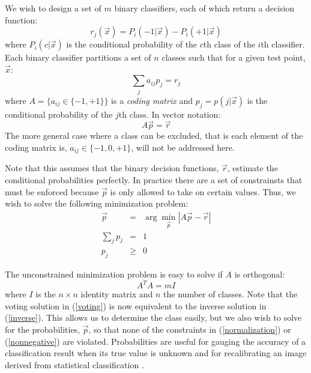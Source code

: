 We wish to design a set of $m$ binary classifiers, each of which return a 
decision function:
\begin{equation}
r_j(\vec x) = P_i(-1 | \vec x) - P_i(+1 | \vec x)
\end{equation}
where $P_i(c | \vec x)$ is the conditional probability of the $c$th class of
the $i$th classifier.
Each binary classifier partitions a set of $n$ classes such that for a
given test point, $\vec x$:
\begin{equation}
\sum_j a_{ij} p_j = r_j
\end{equation}
where $A=\lbrace a_{ij} \in \lbrace -1, +1 \rbrace  \rbrace$ is a {\it coding
matrix} and $p_j = p(j | \vec x)$ is the conditional probability of the $j$th
class.
In vector notation:
\begin{equation}
	A \vec p = \vec r \label{inverse}
\end{equation}
The more general case where a class can be excluded, that is each element of 
the coding matrix is, $a_{ij} \in \lbrace -1, 0, +1\rbrace$, 
will not be addressed here.

Note that this assumes that the binary decision functions, $\vec r$,
estimate the conditional probabilities perfectly.
In practice
there are a set of constrainsts that must be enforced
because $\vec p$ is only allowed to take on certain values.
Thus, we wish to solve the following minimization problem:
\begin{eqnarray}
	\vec p & = & \arg \min_{\vec p} | A \vec p - \vec r | \label{minimization}\\
	\sum_j p_j & = & 1 \label{normalization}\\
	p_j & \ge & 0 \label{nonnegative}
\end{eqnarray}

The unconstrained minimization problem is easy to solve if $A$ is orthogonal:
\begin{equation}
	A^T A = m I
\end{equation}
where $I$ is the $n \times n$ identity matrix and $n$ the number of classes.
Note that the voting solution in (\ref{voting}) is now equivalent to
the inverse solution in (\ref{inverse}).
This allows us to determine the class easily, but we also wish to solve for
the probabilities, $\vec p$, so that none of the constraints in 
(\ref{normalization}) or (\ref{nonnegative}) are violated.
Probabilities are useful for gauging the accuracy of a classification result
when its true value is unknown and for recalibrating an image derived from
statistical classification \citep{Fawcett2006,Mills2009,Mills2011}.

